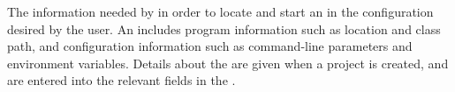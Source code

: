 \item[AUT Configuration]{
The information needed by \jb{}in order to locate and start an \gdaut{} in the configuration desired by the user.
An  includes program information such as  location and class path, and \gdaut configuration information such as command-line parameters and environment variables. Details  about the \gdaut are given when a project is created, and are entered into the relevant
fields in the \gdsuiteeditor{}.  
}
